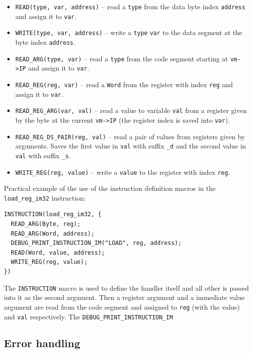 \documentclass[12pt,a4paper,final]{article}
\newcommand{\code}[1]{\texttt{#1}}
\begin{document}
\begin{itemize}
    \item \code{READ(type, var, address)} -- read a \code{type} from the data
        byte index \code{address} and assign it to \code{var}.
    \item \code{WRITE(type, var, address)} -- write a \code{type} \code{var} to
        the data segment at the byte index \code{address}.
    
    \item \code{READ_ARG(type, var)} -- read a \code{type} from the code segment
        starting at \code{vm->IP} and assign it to \code{var}.
    \item \code{READ_REG(reg, var)} -- read a \code{Word} from the register
        with index \code{reg} and assign it to \code{var}.
    \item \code{READ_REG_ARG(var, val)} -- read a value to variable \code{val} 
        from a register given by the byte at the current \code{vm->IP} (the
        register index is saved into \code{var}).
    \item \code{READ_REG_DS_PAIR(reg, val)} -- read a pair of values from
        registers given by arguments. Saves the first value in \code{val} with
        suffix \code{_d} and the second value in \code{val} with suffix
        \code{_s}. 
    \item \code{WRITE_REG(reg, value)} -- write a \code{value} to the register
        with index \code{reg}.
\end{itemize}

Practical example of the use of the instruction definition macros in the
\code{load_reg_im32} instruction:

\begin{verbatim}
INSTRUCTION(load_reg_im32, {
  READ_ARG(Byte, reg);
  READ_ARG(Word, address);
  DEBUG_PRINT_INSTRUCTION_IM("LOAD", reg, address);
  READ(Word, value, address);
  WRITE_REG(reg, value);
})
\end{verbatim}

The \code{INSTRUCTION} macro is used to define the handler itself and all other
is passed into it as the second argument. Then a register argument and a
immediate value argument are read from the code segment and assigned to
\code{reg} (with the value) and \code{val} respectively. The \code{DEBUG_PRINT_INSTRUCTION_IM}

\subsection{Error handling}
\label{sec:errors}
\end{document}
